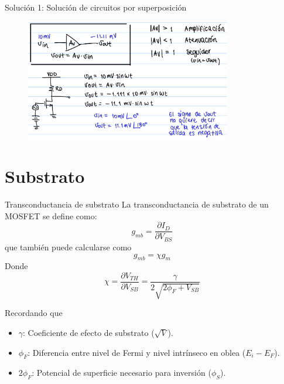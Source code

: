 \documentclass[t,aspectratio=169]{beamer}
\begin{document}
\begin{frame}{Solución 1: Solución de circuitos por superposición}

\begin{figure}[H]
    \centering
    \includegraphics[width=0.8\textwidth]{figuras/ejemplo_1_7.png}

    \includegraphics[width=0.8\textwidth]{figuras/ejemplo_1_8.png}
\end{figure}

\end{frame}


\section{Substrato}
\begin{frame}{Transconductancia de substrato}
La transconductancia de substrato de un MOSFET se define como:
%
\[ g_{mb} = \dfrac{\partial I_D}{\partial V_{BS}} \]
%
que también puede calcularse como
%
\[ g_{mb} = \chi g_m \]
%
Donde
%
\[ \chi = \dfrac{\partial V_{TH}}{\partial V_{SB}} = \dfrac{\gamma}{2\sqrt{2\phi_F+V_{SB}}} \]

Recordando que
\begin{itemize}
    \item $\gamma$: Coeficiente de efecto de substrato ($\sqrt{V}$).
    \item $\phi_F$: Diferencia entre nivel de Fermi y nivel intrínseco en oblea ($E_i - E_F$).
    \item $2\phi_F$: Potencial de superficie necesario para inversión ($\phi_S$).
\end{itemize}

\end{frame}
\end{document}
